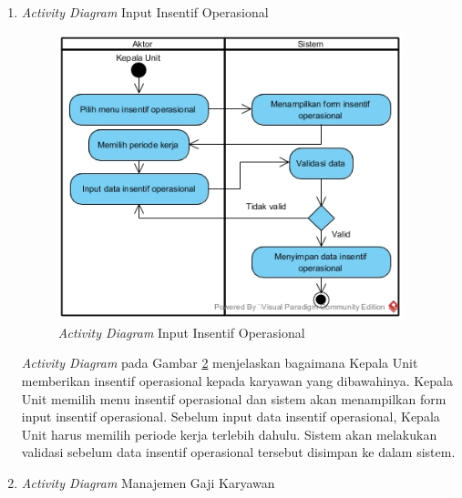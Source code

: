 \begin{enumerate}
\begin{enumerate}[label=\alph*.]
\begin{figure}[H]
            		    \caption{\emph{Activity Diagram} Lihat Data Penilaian Kinerja}
            		    \label{activity_lihat_penilaian}
            		\end{figure}
            		\emph{Activity Diagram} pada Gambar \ref{activity_lihat_penilaian} menjelaskan proses bagaimana karyawan melihat data penilaian kinerja. Karyawan memilih memilih periode kerja dan sistem akan menampilkan data sesuai periode kerja yang dipilih.
            	\end{enumerate}
            	    
            	\item \emph{Activity Diagram} Input Insentif Operasional
            	    \begin{figure}[H]
            		    \centering
            		    \includegraphics[width=10cm]{gambar/activity/input-insentif-operasional}
            		    \caption{\emph{Activity Diagram} Input Insentif Operasional}
            		    \label{activity_input_insentif}
            		\end{figure}
            		\emph{Activity Diagram} pada Gambar \ref{activity_input_insentif} menjelaskan bagaimana Kepala Unit memberikan insentif operasional kepada karyawan yang dibawahinya. Kepala Unit memilih menu insentif operasional dan sistem akan menampilkan form input insentif operasional. Sebelum input data insentif operasional, Kepala Unit harus memilih periode kerja terlebih dahulu. Sistem akan melakukan validasi sebelum data insentif operasional tersebut disimpan ke dalam sistem. 
            	 \item \emph{Activity Diagram} Manajemen Gaji Karyawan
            	 

\end{enumerate}
